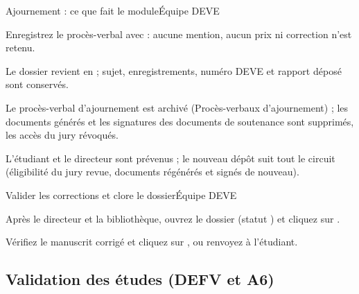 \documentclass[11pt,a4paper]{article}
\begin{document}

\begin{procedure}{Ajournement : ce que fait le module}{Équipe DEVE}
\begin{etapes}
  \item Enregistrez le procès-verbal avec  : aucune mention,
        aucun prix ni correction n'est retenu.
  \item Le dossier revient en  ; sujet, enregistrements,
        numéro DEVE et rapport déposé sont conservés.
  \item Le procès-verbal d'ajournement est archivé (\og Procès-verbaux
        d'ajournement\fg{}) ; les documents générés et les signatures des
        documents de soutenance sont supprimés, les accès du jury révoqués.
  \item L'étudiant et le directeur sont prévenus ; le nouveau dépôt suit tout
        le circuit (éligibilité du jury revue, documents régénérés et signés de
        nouveau).
\end{etapes}
\end{procedure}



\begin{procedure}{Valider les corrections et clore le dossier}{Équipe DEVE}
\begin{etapes}
  \item Après le directeur et la bibliothèque, ouvrez le dossier (statut
        ) et cliquez sur
        .
  \item Vérifiez le manuscrit corrigé et cliquez sur , ou renvoyez à l'étudiant.
\end{etapes}
\end{procedure}


\subsection{Validation des études (DEFV et A6)}\label{sec:a6}
\end{document}

